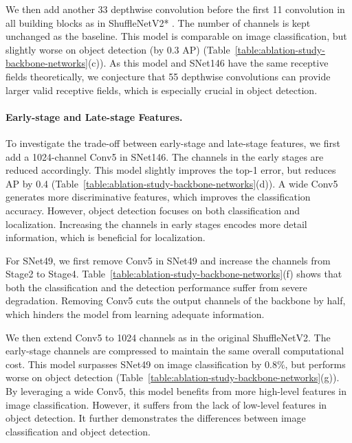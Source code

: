 \documentclass[10pt,twocolumn,letterpaper]{article}
\begin{document}
We then add another 33 depthwise convolution before the first 11 convolution in all building blocks as in ShuffleNetV2* \cite{ma2018shufflenet}.
The number of channels is kept unchanged as the baseline.
This model is comparable on image classification, but slightly worse on object detection (by 0.3 AP) (Table~\ref{table:ablation-study-backbone-networks}(c)).
As this model and SNet146 have the same receptive fields theoretically, we conjecture that 55 depthwise convolutions can provide larger valid receptive fields, which is especially crucial in object detection.

\vspace{-12pt}
\paragraph{Early-stage and Late-stage Features.}

To investigate the trade-off between early-stage and late-stage features, we first add a 1024-channel Conv5 in SNet146.
The channels in the early stages are reduced accordingly.
This model slightly improves the top-1 error, but reduces AP by 0.4 (Table~\ref{table:ablation-study-backbone-networks}(d)).
A wide Conv5 generates more discriminative features, which improves the classification accuracy.
However, object detection focuses on both classification and localization.
Increasing the channels in early stages encodes more detail information, which is beneficial for localization.

For SNet49, we first remove Conv5 in SNet49 and increase the channels from Stage2 to Stage4.
Table~\ref{table:ablation-study-backbone-networks}(f) shows that both the classification and the detection performance suffer from severe degradation.
Removing Conv5 cuts the output channels of the backbone by half, which hinders the model from learning adequate information.


We then extend Conv5 to 1024 channels as in the original ShuffleNetV2.
The early-stage channels are compressed to maintain the same overall computational cost.
This model surpasses SNet49 on image classification by 0.8\%, but performs worse on object detection (Table~\ref{table:ablation-study-backbone-networks}(g)).
By leveraging a wide Conv5, this model benefits from more high-level features in image classification.
However, it suffers from the lack of low-level features in object detection.
It further demonstrates the differences between image classification and object detection.
\end{document}
